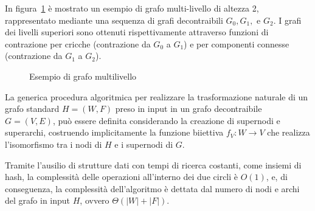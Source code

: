 In figura~\ref{fig:multi-level-graph-example} \`e mostrato un esempio di grafo multi-livello di altezza 2,
rappresentato mediante una sequenza di grafi decontraibili $G_0, G_1,$ e $G_2$. I grafi dei livelli superiori
sono ottenuti rispettivamente attraverso funzioni di contrazione per cricche (contrazione da $G_0$ a $G_1$) e
per componenti connesse (contrazione da $G_1$ a $G_2$).

\begin{figure}
    
    \caption{Esempio di grafo multilivello}
    \label{fig:multi-level-graph-example}
\end{figure}

\newpage

\label{subsec:algoritmo-di-trasformazione-naturale}

La generica procedura algoritmica per realizzare la trasformazione naturale di un grafo standard $H = (W, F)$
preso in input in un grafo decontraibile $G = (V, E)$, può essere definita considerando la creazione di supernodi
e superarchi, costruendo implicitamente la funzione biiettiva $f_V: W \rightarrow V$ che realizza l'isomorfismo tra i nodi
di $H$ e i supernodi di $G$.



Tramite l'ausilio di strutture dati con tempi di ricerca costanti, come insiemi di hash, la complessit\`a delle
operazioni all'interno dei due circli \`e $O(1)$,
e, di conseguenza, la complessit\`a dell'algoritmo \`e dettata dal numero di nodi e archi del grafo in input $H$,
ovvero $\Theta(|W| + |F|)$.